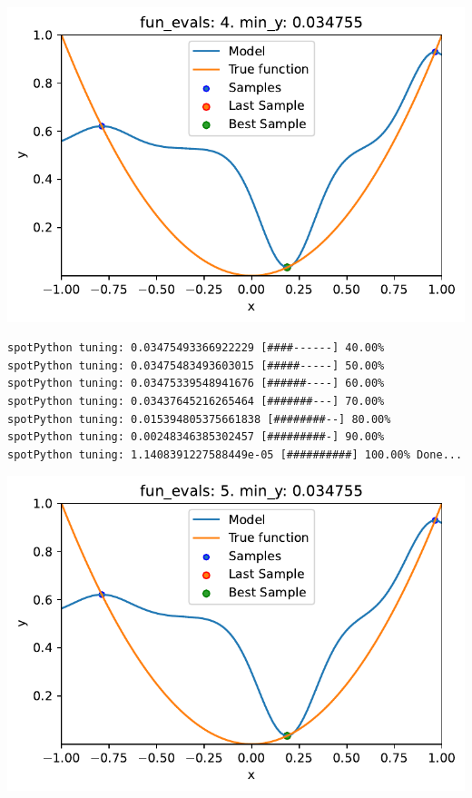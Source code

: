\documentclass[
  letterpaper,
  DIV=11,
  numbers=noendperiod]{scrreprt}
\begin{document}
\includegraphics{010_num_spot_sklearn_surrogate_files/figure-pdf/cell-39-output-2.pdf}

\begin{verbatim}
spotPython tuning: 0.03475493366922229 [####------] 40.00% 
spotPython tuning: 0.03475483493603015 [#####-----] 50.00% 
spotPython tuning: 0.03475339548941676 [######----] 60.00% 
spotPython tuning: 0.03437645216265464 [#######---] 70.00% 
spotPython tuning: 0.015394805375661838 [########--] 80.00% 
spotPython tuning: 0.00248346385302457 [#########-] 90.00% 
spotPython tuning: 1.1408391227588449e-05 [##########] 100.00% Done...
\end{verbatim}

\includegraphics{010_num_spot_sklearn_surrogate_files/figure-pdf/cell-39-output-4.pdf}
\end{document}
